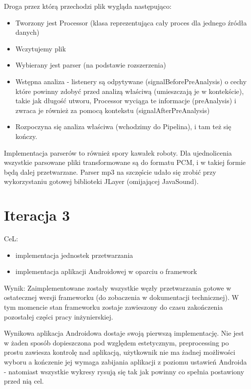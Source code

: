 \begin{Note}
Droga przez którą przechodzi plik wygląda następująco:
\begin{itemize}
    \item Tworzony jest Processor (klasa reprezentująca cały proces dla jednego źródła danych)
    \item Wczytujemy plik
    \item Wybierany jest parser (na podstawie rozszerzenia)
    \item Wstępna analiza - listenery są odpytywane (signalBeforePreAnalysis) o cechy które powinny zdobyć przed analizą właściwą (umieszczają je w kontekście), takie jak długość utworu, Processor wyciąga te informacje (preAnalysis) i zwraca je również za pomocą kontekstu (signalAfterPreAnalysis)
    \item Rozpoczyna się analiza właściwa (wchodzimy do Pipelina), i tam też się kończy.
\end{itemize}
Implementacja parserów to również spory kawałek roboty. Dla ujednolicenia wszystkie parsowane pliki transformowane są do formatu PCM, i w takiej formie będą dalej przetwarzane. Parser mp3 na szczęście udało się zrobić przy wykorzystaniu gotowej biblioteki JLayer (omijającej JavaSound).
\end{Note}

\section{Iteracja 3}

\begin{Note}
CeL:
\begin{itemize}
\item implementacja jednostek przetwarzania
\item implementacja aplikacji Androidowej w oparciu o framework
\end{itemize}

Wynik:
Zaimplementowane zostały wszystkie węzły przetwarzania gotowe w ostatecznej wersji frameworku (do zobaczenia w dokumentacji technicznej).  W tym momencie stan frameworku zostaje zawieszony do czasu zakończenia pozostałej części pracy inżynierskiej.

Wynikowa aplikacja Androidowa dostaje swoją pierwszą implementację. Nie jest w żaden sposób dopieszczona pod względem estetycznym, preprocessing po prostu zawiesza kontrolę nad aplikacją, użytkownik nie ma żadnej możliwości wyboru a kończenie jej wymaga zabijania aplikacji z poziomu ustawień Androida - natomiast wszystkie wykresy rysują się tak jak powinny co spełnia postawiony przed nią cel.
\end{Note}
